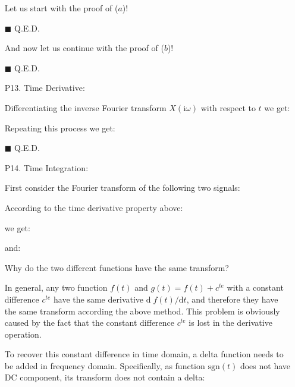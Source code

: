 \begin{itemize}
	
	Let us start with the proof of ($a$)!
	
	\begin{dem}
	
	\begin{flushright}
		$\blacksquare$  Q.E.D.
	\end{flushright}
	\end{dem}
	And now let us continue with the proof of ($b$)!

	\begin{dem}
	
	
	\begin{flushright}
		$\blacksquare$  Q.E.D.
	\end{flushright}
	\end{dem}
	
	\item[P13.]  Time Derivative\label{fourier transform time derivative}:
	
	\begin{dem} 
	Differentiating the inverse Fourier transform $X(\mathrm{i}\omega)$ with respect to $t$ we get:
	
	Repeating this process we get:
	
	\begin{flushright}
		$\blacksquare$  Q.E.D.
	\end{flushright}
	\end{dem}
	
	\item[P14.] Time Integration\label{fourier transform time integration}:
	
	First consider the Fourier transform of the following two signals:
	
	
	According to the time derivative property above:
	
	we get:
	
	and:
	
	Why do the two different functions have the same transform?
	
	In general, any two function $f(t)$ and $g(t)=f(t)+c^{te}$ with a constant difference $c^{te}$ have the same derivative $\mathrm{d}\;f(t)/\mathrm{d}t$, and therefore they have the same transform according the above method. This problem is obviously caused by the fact that the constant difference $c^{te}$ is lost in the derivative operation.
	
	To recover this constant difference in time domain, a delta function 
	needs to be added in frequency domain. Specifically, as function $\mathrm{sgn}(t)$ does not have DC component, its transform does not contain a delta:
	

\end{itemize}
